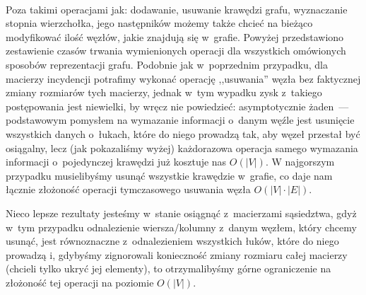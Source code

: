 ~

Poza takimi operacjami jak: dodawanie, usuwanie krawędzi grafu, wyznaczanie stopnia wierzchołka, jego następników możemy także chcieć na bieżąco modyfikować ilość węzłów, jakie znajdują się w~grafie. Powyżej przedstawiono zestawienie czasów trwania wymienionych operacji dla wszystkich omówionych sposobów reprezentacji grafu. Podobnie jak w~poprzednim przypadku, dla macierzy incydencji potrafimy wykonać operację ,,usuwania'' węzła bez faktycznej zmiany rozmiarów tych macierzy, jednak w~tym wypadku zysk z~takiego postępowania jest niewielki, by wręcz nie powiedzieć: asymptotycznie żaden~---  podstawowym pomysłem na wymazanie informacji o~danym węźle jest usunięcie wszystkich danych o~łukach, które do niego prowadzą tak, aby węzeł przestał być osiągalny, lecz (jak pokazaliśmy wyżej) każdorazowa operacja samego wymazania informacji o~pojedynczej krawędzi już kosztuje nas $O \left( \left| V \right| \right) $. W najgorszym przypadku musielibyśmy usunąć wszystkie krawędzie w~grafie, co daje nam łącznie złożoność operacji tymczasowego usuwania węzła $O \left( \left| V \right| \cdot  \left| E \right| \right) $. 

Nieco lepsze rezultaty jesteśmy w~stanie osiągnąć z~macierzami sąsiedztwa, gdyż w~tym przypadku odnalezienie wiersza/kolumny z~danym węzłem, który chcemy usunąć, jest równoznaczne z~odnalezieniem wszystkich łuków, które do niego prowadzą i, gdybyśmy zignorowali konieczność zmiany rozmiaru całej macierzy (chcieli tylko ukryć jej elementy), to otrzymalibyśmy górne ograniczenie na złożoność tej operacji na poziomie $ O \left( \left| V \right| \right)$.

